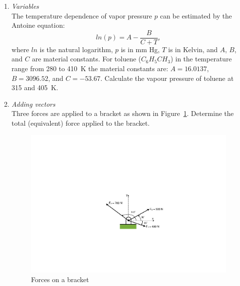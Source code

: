\begin{enumerate}
\item \textit{Variables}\\
The temperature dependence of vapor pressure $p$ can be estimated by the Antoine equation:
\begin{equation*}
ln(p) = A - \frac{B}{C + T},
\end{equation*}
where $ln$ is the natural logarithm, $p$ is in mm Hg, $T$ is in Kelvin, and $A$, $B$, and $C$ are material constants. For toluene ($C_6H_5CH_3$) in the temperature range from 280 to 410~K the material constants are: $A = 16.0137$, $B = 3096.52$, and $C = -53.67$. Calculate the vapour pressure of toluene at 315 and 405~K.

\item \textit{Adding vectors}\\
Three forces are applied to a bracket as shown in Figure~\ref{fig:adding-forces}. Determine the total (equivalent) force applied to the bracket.
\begin{figure}[h]
	\myfloatalign
	\includegraphics[width=0.65\linewidth]{Graphics/Additional-Ex/adding-forces}
	\caption{Forces on a bracket}
	\label{fig:adding-forces}
\end{figure}


\end{enumerate}

